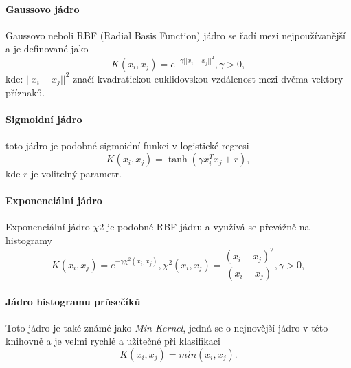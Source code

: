 \paragraph*{Gaussovo jádro}
Gaussovo neboli RBF (Radial Basis Function) jádro se řadí mezi nejpoužívanější a je definované jako
\begin{equation*}
\label{RBFK}
 K(x_i, x_j) = e^{-\gamma ||x_i - x_j||^2}, \gamma > 0,
\end{equation*}
kde: $||x_i - x_j||^2$ značí kvadratickou euklidovskou vzdálenost mezi dvěma vektory příznaků.

\paragraph*{Sigmoidní jádro}
toto jádro je podobné sigmoidní funkci v logistické regresi
\begin{equation*}
\label{sigmK}
 K(x_i, x_j) = \tanh(\gamma x_i^T x_j + r),
\end{equation*}
kde $r$ je volitelný parametr.

\paragraph*{Exponenciální jádro}
Exponenciální jádro $\chi$2 je podobné RBF jádru a využívá se převážně na histogramy
\begin{equation*}
\label{expK}
 K(x_i, x_j) = e^{-\gamma \chi^2(x_i,x_j)}, \chi^2(x_i,x_j) = \frac{(x_i-x_j)^2}{(x_i+x_j)}, \gamma > 0,
\end{equation*}

\paragraph*{Jádro histogramu průsečíků}
Toto jádro je také známé jako \textit{Min Kernel}, jedná se o nejnovější jádro v této knihovně a je velmi rychlé a užitečné při klasifikaci
\begin{equation*}
\label{innK}
 K(x_i, x_j) = min(x_i,x_j).
\end{equation*}

